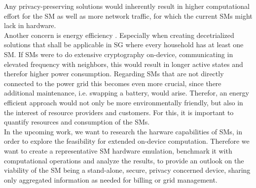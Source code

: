 \documentclass[english]{tudscrartcl}
\begin{document}
	Any privacy-preserving solutions would inherently result in higher computational effort for the SM as well as more network traffic,
	for which the current SMs might lack in hardware.
	\\ %
	Another concern is energy efficiency \cite{RASHEDMOHASSEL2014473}.
	Especially when creating decetrialized solutions that shall be applicable in SG where every household has at least one SM.
	If SMs were to do extensive cryptography on-device, communicating in elevated frequency with neighbors,
	this would result in longer active states and therefor higher power consumption.
	Regarding SMs that are not directly connected to the power grid this becomes even more crucial,
	since there additional maintenance, i.e. swapping a battery, would arise.
	Therefor, an energy efficient approach would not only be more environmentally friendly,
	but also in the interest of resource providers and customers.
	For this, it is important to quantify resources and consumption of the SMs.
	\\ %
	In the upcoming work, we want to research the harware capabilities of SMs,
	in order to explore the feasibility for extended on-device computation.
	Therefore we want to create a representative SM hardware emulation,
	benchmark it with computational operations and analyze the results,
	to provide an outlook on the viability of the SM being a stand-alone, secure, privacy concerned device,
	sharing only aggregated information as needed for billing or grid management.
	
\end{document}
